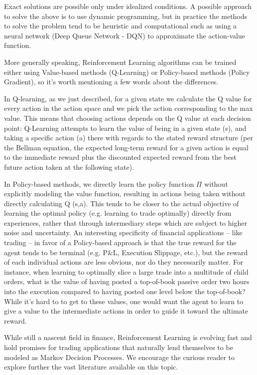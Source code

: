 Exact solutions are possible only under idealized conditions. A possible approach to solve the above is to use dynamic programming, but in practice the methods to solve the problem tend to be heuristic and computational such as using a neural network (Deep Queue Network - DQN) to approximate the action-value function.  
\twomedskip

More generally speaking, Reinforcement Learning algorithms can be trained either using Value-based methods (Q-Learning) or Policy-based methods (Policy Gradient), so it's worth mentioning a few words about the differences.

In Q-learning, as we just described, for a given state we calculate the Q value for every action in the action space and we pick the action corresponding to the max value. This means that choosing actions depends on the Q value at each decision point: Q-Learning attempts to learn the value of being in a given state (s), and taking a specific action (a) there with regards to the stated reward structure (per the Bellman equation, the expected long-term reward for a given action is equal to the immediate reward plus the discounted expected reward from the best future action taken at the following state). 

In Policy-based methods, we directly learn the policy function $\Pi$ without explicitly modeling the value function, resulting in actions being taken without directly calculating Q (s,a). This tends to be closer to the actual objective of learning the optimal policy (e.g. learning to trade optimally) directly from experiences, rather that through intermediary steps which are subject to higher noise and uncertainty. An interesting specificity of financial applications -- like trading -- in favor of a Policy-based approach is that the true reward for the agent tends to be terminal (e.g. P\&L, Execution Slippage, etc.), but the reward of each individual actions are less obvious, nor do they necessarily matter. For instance, when learning to optimally slice a large trade into a multitude of child orders, what is the value of having posted a top-of-book passive order two hours into the execution compared to having posted one level below the top-of-book? While it's hard to to get to these values, one would want the agent to learn to give a value to the intermediate actions in order to guide it toward the ultimate reward. \twomedskip

While still a nascent field in finance, Reinforcement Learning is evolving fast and hold promises for trading applications that naturally lend themselves to be modeled as Markov Decision Processes. We encourage the curious reader to explore further the vast literature available on this topic.



